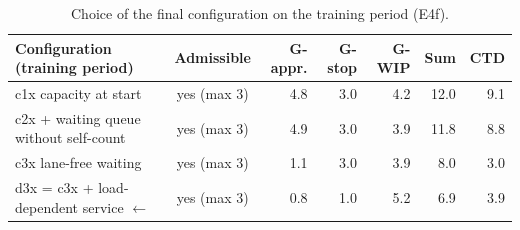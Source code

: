 \begin{table}[htbp]
\centering
\footnotesize
\begin{tabular}{lcrrrrr}
\toprule
\textbf{Configuration (training period)} & \textbf{Admissible} & \textbf{G-appr.} & \textbf{G-stop} & \textbf{G-WIP} & \textbf{Sum} & \textbf{CTD} \\
\midrule
c1x capacity at start & yes (max 3) & 4.8 & 3.0 & 4.2 & 12.0 & 9.1 \\
c2x + waiting queue without self-count & yes (max 3) & 4.9 & 3.0 & 3.9 & 11.8 & 8.8 \\
c3x lane-free waiting & yes (max 3) & 1.1 & 3.0 & 3.9 & 8.0 & 3.0 \\
d3x = c3x + load-dependent service $\leftarrow$ & yes (max 3) & 0.8 & 1.0 & 5.2 & 6.9 & 3.9 \\
\bottomrule
\end{tabular}
\par{}
\caption{Choice of the final configuration on the training period (E4f).}
\label{tab:rq2_selection}
\end{table}
